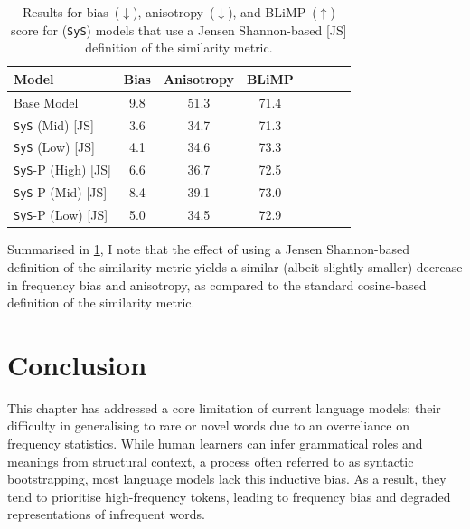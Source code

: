 \begin{table}[ht!]
\centering
\small
\begin{tabular}{l||cc|ccccc}
\toprule
\textbf{Model}  &  \textbf{Bias}  & \textbf{Anisotropy} & \textbf{BLiMP} \\
\midrule
Base Model & 9.8 & 51.3 & 71.4  \\
\midrule
\texttt{SyS} (Mid) \hspace{0.42cm} [JS]  & 3.6 & 34.7 & 71.3 \\
\texttt{SyS} (Low) \hspace{0.38cm} [JS]  & 4.1 & 34.6 & 73.3  \\
\texttt{SyS}-P (High) \hspace{0.05cm} [JS] & 6.6 & 36.7  & 72.5  \\ 
\texttt{SyS}-P (Mid) \hspace{0.15cm} [JS] & 8.4 & 39.1 &  73.0 \\ 
\texttt{SyS}-P (Low) \hspace{0.12cm} [JS] & 5.0 &  34.5 & 72.9 \\ 
\bottomrule
\end{tabular}
\caption{\label{tbl:jsd-similarity-metric-results}
Results for bias~($\downarrow$), anisotropy~($\downarrow$), and BLiMP~($\uparrow$) score for \smoothing (\texttt{SyS}) models that use a Jensen Shannon-based [JS] definition of the similarity metric.}
\end{table}

Summarised in \cref{tbl:jsd-similarity-metric-results}, I note that the effect of using a Jensen Shannon-based definition of the similarity metric yields a similar (albeit slightly smaller) decrease in frequency bias and anisotropy, as compared to the standard cosine-based definition of the similarity metric.   

\section{Conclusion}
\label{sec:conclusion}

This chapter has addressed a core limitation of current language models: their difficulty in generalising to rare or novel words due to an overreliance on frequency statistics. While human learners can infer grammatical roles and meanings from structural context, a process often referred to as syntactic bootstrapping, most language models lack this inductive bias. As a result, they tend to prioritise high-frequency tokens, leading to frequency bias and degraded representations of infrequent words.

